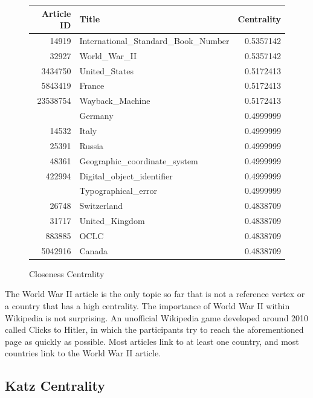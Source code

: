 \documentclass{article}
\begin{document}
\begin{figure}[H]
    \caption[fig]{Closeness Centrality}
    \centering
    \begin{tabular}{rlr}
        \toprule
        Article ID & Title & Centrality \\
        \midrule
        14919 & International\_Standard\_Book\_Number & 0.5357142\\
        32927 & World\_War\_II & 0.5357142\\
        3434750 & United\_States & 0.5172413\\
        5843419 & France & 0.5172413\\
        23538754 & Wayback\_Machine & 0.5172413\\
        \addlinespace
        11867 & Germany & 0.4999999\\
        14532 & Italy & 0.4999999\\
        25391 & Russia & 0.4999999\\
        48361 & Geographic\_coordinate\_system & 0.4999999\\
        422994 & Digital\_object\_identifier & 0.4999999\\
        \addlinespace
        1057428 & Typographical\_error & 0.4999999\\
        26748 & Switzerland & 0.4838709\\
        31717 & United\_Kingdom & 0.4838709\\
        883885 & OCLC & 0.4838709\\
        5042916 & Canada & 0.4838709\\
    \bottomrule
\end{tabular}
\end{figure}

The World War II article is the only topic so far that is not a reference vertex or a country that has a high centrality. The importance of World War II within Wikipedia is not surprising. An unofficial Wikipedia game developed around 2010 called Clicks to Hitler, in which the participants try to reach the aforementioned page as quickly as possible.
Most articles link to at least one country, and most countries link to the World War II article.

\subsection{Katz Centrality}
\end{document}
